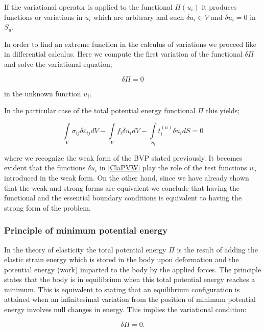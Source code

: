 If the variational operator is applied to the functional $\Pi (u_i)$ it produces functions or variations in $u_i$ which are arbitrary and such $\delta {u_i} \in V$ and $\delta {u_i} = 0$ in $S_u$.

In order to find an extreme function in the calculus of variations we proceed like in differential calculus. Here we compute the first variation of the functional $\delta \Pi$ and solve the variational equation;

\begin{equation}
\delta \Pi  = 0
\label{vareq}
\end{equation}

in the unknown function $u_i$. 

In the particular case of the total potential energy functional $\Pi$ this yields;

\begin{equation}
\int\limits_V {{\sigma _{ij}}\delta {\varepsilon _{ij}}dV}  - \int\limits_V {{f_i}\delta {u_i}dV}  - \int\limits_{{S_t}} {t_i^{(n)}\delta {u_i}dS}  = 0
\label{ClaPVW}
\end{equation}

where we recognize the weak form of the BVP stated previously. It becomes evident that the functions $\delta {u_i}$ in \cref{ClaPVW} play the role of the test functions $w_i$ introduced in the weak form. On the other hand, since we have already shown that the weak and strong forms are equivalent we conclude that having the functional and the essential boundary conditions is equivalent to having the strong form of the problem.


\subsubsection*{Principle of minimum potential energy}
In the theory of elasticity the total potential energy $\Pi$ is the result of adding the elastic strain energy which is stored in the body upon deformation and the potential energy (work) imparted to the body by the applied forces. The principle states that the body is in equilibrium when this total potential energy reaches a minimum. This is equivalent to stating that an equilibrium configuration is attained when an infinitesimal variation from the position of minimum potential energy involves null changes in energy. This implies the variational condition:

\begin{equation}
\delta \Pi  = 0.
\label{vareq2}
\end{equation}

